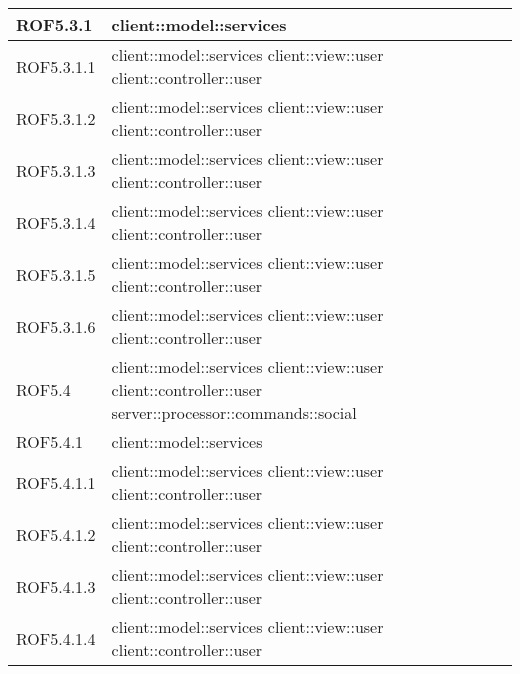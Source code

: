 \begin{center}
\begin{longtable}{| p{4cm} | p{8cm} |}
\hline
ROF5.3.1 & client::model::services \\
\hline
ROF5.3.1.1 & client::model::services \newline client::view::user \newline client::controller::user \\
\hline
ROF5.3.1.2 & client::model::services \newline client::view::user \newline client::controller::user \\
\hline
ROF5.3.1.3 & client::model::services \newline client::view::user \newline client::controller::user \\
\hline
ROF5.3.1.4 & client::model::services \newline client::view::user \newline client::controller::user \\
\hline
ROF5.3.1.5 & client::model::services \newline client::view::user \newline client::controller::user \\
\hline
ROF5.3.1.6 & client::model::services \newline client::view::user \newline client::controller::user \\
\hline
ROF5.4 & client::model::services \newline client::view::user \newline client::controller::user \newline server::processor::commands::social \\
\hline
ROF5.4.1 & client::model::services \\
\hline
ROF5.4.1.1 & client::model::services \newline client::view::user \newline client::controller::user \\
\hline
ROF5.4.1.2 & client::model::services \newline client::view::user \newline client::controller::user \\
\hline
ROF5.4.1.3 & client::model::services \newline client::view::user \newline client::controller::user \\
\hline
ROF5.4.1.4 & client::model::services \newline client::view::user \newline client::controller::user \\

\end{longtable}
\end{center}
